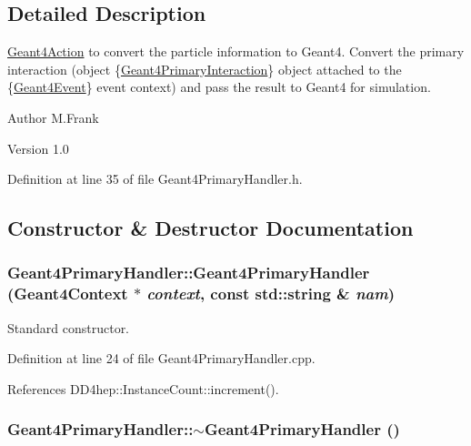 \subsection{Detailed Description}
\hyperlink{class_d_d4hep_1_1_simulation_1_1_geant4_action}{Geant4Action} to convert the particle information to Geant4. Convert the primary interaction (object \{\hyperlink{class_d_d4hep_1_1_simulation_1_1_geant4_primary_interaction}{Geant4PrimaryInteraction}\} object attached to the \{\hyperlink{class_d_d4hep_1_1_simulation_1_1_geant4_event}{Geant4Event}\} event context) and pass the result to Geant4 for simulation.

\begin{DoxyAuthor}{Author}
M.Frank 
\end{DoxyAuthor}
\begin{DoxyVersion}{Version}
1.0 
\end{DoxyVersion}


Definition at line 35 of file Geant4PrimaryHandler.h.

\subsection{Constructor \& Destructor Documentation}
\hypertarget{class_d_d4hep_1_1_simulation_1_1_geant4_primary_handler_abc9c6880682a0ade66bdb15774e67180}{
\subsubsection[{Geant4PrimaryHandler}]{\setlength{\rightskip}{0pt plus 5cm}Geant4PrimaryHandler::Geant4PrimaryHandler ({\bf Geant4Context} $\ast$ {\em context}, \/  const std::string \& {\em nam})}}
\label{class_d_d4hep_1_1_simulation_1_1_geant4_primary_handler_abc9c6880682a0ade66bdb15774e67180}


Standard constructor. 

Definition at line 24 of file Geant4PrimaryHandler.cpp.

References DD4hep::InstanceCount::increment().\hypertarget{class_d_d4hep_1_1_simulation_1_1_geant4_primary_handler_aa559ec3b18b6663b07914aba80760212}{
\subsubsection[{$\sim$Geant4PrimaryHandler}]{\setlength{\rightskip}{0pt plus 5cm}Geant4PrimaryHandler::$\sim$Geant4PrimaryHandler ()}}
\label{class_d_d4hep_1_1_simulation_1_1_geant4_primary_handler_aa559ec3b18b6663b07914aba80760212}


